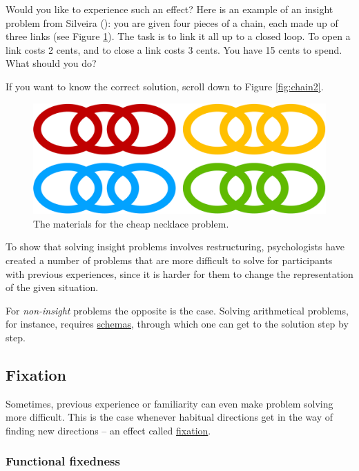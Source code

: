 \documentclass[
]{krantz}
\begin{document}
Would you like to experience such an effect? Here is an example of an insight problem from Silveira (): you are given four pieces of a chain, each made up of three links (see Figure \ref{fig:chain1}). The task is to link it all up to a closed loop. To open a link costs 2 cents, and to close a link costs 3 cents. You have 15 cents to spend. What should you do?

If you want to know the correct solution, scroll down to Figure \ref{fig:chain2}.

\begin{figure}

{\centering \includegraphics[width=0.6\linewidth]{images/ch10/chain1} 

}

\caption{The materials for the cheap necklace problem.}\label{fig:chain1}
\end{figure}

To show that solving insight problems involves restructuring, psychologists have created a number of problems that are more difficult to solve for participants with previous experiences, since it is harder for them to change the representation of the given situation.

For \emph{non-insight} problems the opposite is the case. Solving arithmetical problems, for instance, requires \hyperref[schemas]{schemas}, through which one can get to the solution step by step.

\subsection*{Fixation}\label{fixation}


Sometimes, previous experience or familiarity can even make problem solving more difficult. This is the case whenever habitual directions get in the way of finding new directions -- an effect called \hyperref[fixation]{fixation}.

\subsubsection*{Functional fixedness}\label{functional-fixedness}
\end{document}
